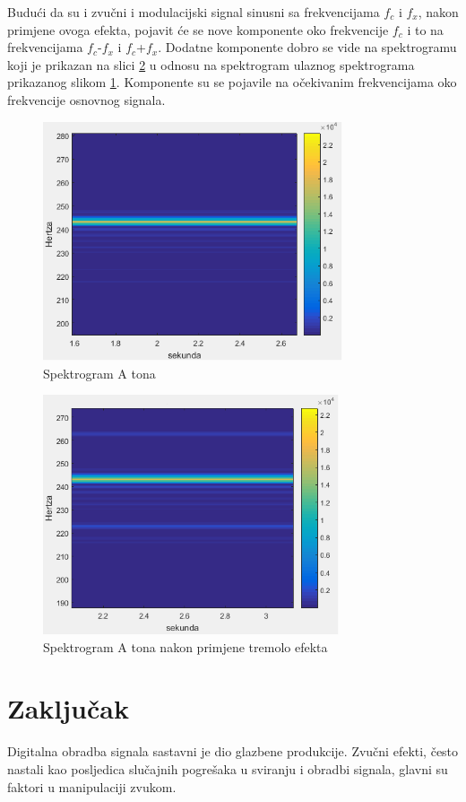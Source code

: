 \documentclass[conference]{IEEEtran}
\begin{document}
Budući da su i zvučni i modulacijski signal sinusni sa frekvencijama $f_{c}$ i $f_{x}$, nakon primjene ovoga efekta, pojavit
će se nove komponente oko frekvencije $f_{c}$ i to na frekvencijama $f_{c}$-$f_{x}$ i $f_{c}$+$f_{x}$. Dodatne komponente
dobro se vide na
spektrogramu koji je prikazan na slici \ref{tremolo_izlaz} u odnosu na spektrogram ulaznog spektrograma prikazanog
slikom \ref{tremolo_ulaz}. Komponente su se pojavile na očekivanim frekvencijama oko frekvencije osnovnog
signala.

\begin{figure}[H]
   \centerline{\includegraphics[height=200pt]{slike/tremolo_spektar_ulaz.png}}
   \caption{Spektrogram A tona}
   \label{tremolo_ulaz}
 \end{figure}

 \begin{figure}[H]
   \centerline{\includegraphics[height=200pt]{slike/tremolo_spektar_izlaz.png}}
   \caption{Spektrogram A tona nakon primjene tremolo efekta}
   \label{tremolo_izlaz}
 \end{figure}

\section{Zaključak}
Digitalna obradba signala sastavni je dio glazbene produkcije. Zvučni efekti, često nastali kao
posljedica slučajnih pogrešaka u sviranju i obradbi signala, glavni su faktori u manipulaciji zvukom.
\end{document}
